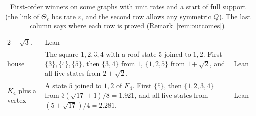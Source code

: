 \begin{table}[t]
\begin{tabular}{@{}>{\raggedright\arraybackslash}p{2.1cm}
>{\raggedright\arraybackslash}p{10.2cm}
>{\raggedright\arraybackslash}p{2.6cm}@{}}
$2+\sqrt3$. & Lean\\
house & The square $1,2,3,4$ with a roof state $5$ joined to $1,2$.
First $\{3\},\{4\},\{5\}$, then $\{3,4\}$ from $1$, $\{1,2,5\}$ from $1+\sqrt2$, and
all five states from $2+\sqrt2$. & Lean\\
$K_4$ plus a vertex & A state $5$ joined to $1,2$ of $K_4$. First $\{5\}$, then
$\{1,2,3,4\}$ from $3(\sqrt{17}+1)/8=1.921$, and all five states from
$(5+\sqrt{17})/4=2.281$. & Lean\\
\bottomrule
\end{tabular}
\caption{First-order winners on some graphs with unit rates and a start of full
support (the link of $\Theta_\varepsilon$ has rate $\varepsilon$, and the second
row allows any symmetric $Q$). The last column says where
each row is proved (Remark~\ref{rem:outcomes}).}
\label{tab:outcomes}
\end{table}

